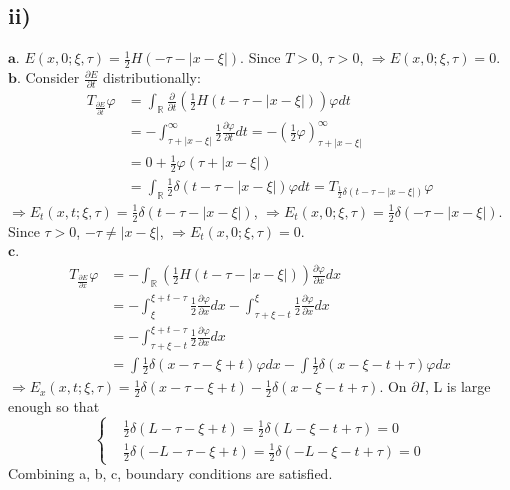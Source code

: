 \documentclass[a4paper, 11pt]{article}
\begin{document}
\begin{spacing}{1.5}
\subsection*{ii)}
$\boldsymbol{a}$. $E(x,0;\xi,\tau) = \frac{1}{2} H(-\tau-|x-\xi|)$. Since $T>0$, $\tau > 0$, $\Rightarrow E(x,0;\xi,\tau) = 0$.\\
$\boldsymbol{b}$. Consider $\frac{\partial E}{\partial t}$ distributionally:
\begin{align*}
T_{\frac{\partial E}{\partial t}} \varphi 
& = \int_{\mathbb{R}} \frac{\partial}{\partial t} \left( \frac{1}{2} H(t-\tau-|x-\xi|) \right)  \varphi dt \\
& = - \int_{\tau + |x-\xi|}^{\infty} \frac{1}{2} \frac{\partial \varphi}{\partial t} dt = - \left( \frac{1}{2} \varphi \right)_{\tau + |x-\xi|} ^ \infty \\
& = 0 + \frac{1}{2} \varphi \left( \tau + |x-\xi| \right) \\
& = \int_{\mathbb{R}} \frac{1}{2} \delta (t-\tau-|x-\xi|)\varphi dt = T_{\frac{1}{2}\delta(t-\tau-|x-\xi|)} \varphi 
\end{align*}
$\Rightarrow E_t(x,t;\xi,\tau) = \frac{1}{2}\delta(t-\tau-|x-\xi|)$, $\Rightarrow E_t(x,0;\xi,\tau) = \frac{1}{2}\delta(-\tau-|x-\xi|)$. Since $\tau > 0$, $-\tau \neq |x-\xi|$, $\Rightarrow E_t(x,0;\xi,\tau)=0$. \\
$\boldsymbol{c}$. 
\begin{align*}
T_{\frac{\partial E}{\partial x}} \varphi 
& = -\int_{\mathbb{R}} \left( \frac{1}{2} H(t-\tau-|x-\xi|) \right) \frac{\partial \varphi}{\partial x} dx \\
& = -\int_{\xi}^{\xi+t-\tau} \frac{1}{2} \frac{\partial \varphi}{\partial x} dx - \int_{\tau+\xi-t}^{\xi} \frac{1}{2} \frac{\partial \varphi }{\partial x} dx \\
& = -\int_{\tau+\xi-t}^{\xi+t-\tau}\frac{1}{2} \frac{\partial \varphi }{\partial x} dx \\
& = \int \frac{1}{2} \delta (x-\tau -\xi +t) \varphi dx - \int \frac{1}{2} \delta(x-\xi-t+\tau) \varphi dx
\end{align*}
$\Rightarrow E_x(x,t;\xi,\tau)=\frac{1}{2} \delta (x-\tau-\xi+t) - \frac{1}{2} \delta (x-\xi-t+\tau)$. On $\partial I$, L is large enough so that
$$
\left\lbrace 
\begin{aligned}
& \frac{1}{2} \delta (L-\tau-\xi+t) = \frac{1}{2} \delta (L-\xi-t+\tau)=0 \\
& \frac{1}{2} \delta(-L-\tau-\xi+t) = \frac{1}{2} \delta(-L-\xi-t+\tau)=0
\end{aligned}
\right.
$$
Combining a, b, c, boundary conditions are satisfied.


\end{spacing}
\end{document}
